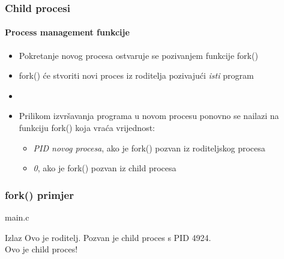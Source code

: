 \documentclass[table,usenames,dvipsnames]{beamer}
\begin{document}
\begin{frame}[t]
\frametitle{Child procesi}
\framesubtitle{Process management funkcije}
\begin{itemize}
  \item Pokretanje novog procesa ostvaruje se pozivanjem funkcije fork()
  \item fork() će stvoriti novi proces iz roditelja pozivajući \emph{isti} program
  \item[]
  \item Prilikom izvršavanja programa u novom procesu ponovno se nailazi na funkciju fork() koja vraća vrijednost:
  \begin{itemize}
    \item \emph{PID novog procesa}, ako je fork() pozvan iz roditeljskog procesa
    \item \emph{0}, ako je fork() pozvan iz child procesa
  \end{itemize}
\end{itemize}
\end{frame}


\begin{frame}[t]
	\frametitle{fork() primjer}
	\begin{block}{main.c}
		\makeset
	\end{block}
	\begin{block}{Izlaz}{\small \ttfamily
		Ovo je roditelj. Pozvan je child proces s PID 4924.\\
		Ovo je child proces!
	}\end{block}
\end{frame}
 
\end{document}
